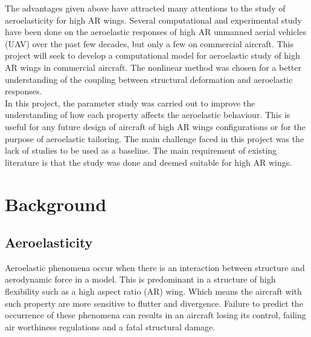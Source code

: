 \documentclass[11pt]{article}
\begin{document}
The advantages given above have attracted many attentions to the study of aeroelasticity for high AR wings. Several computational and experimental study have been done on the aeroelastic responses of high AR unmanned aerial vehicles (UAV) over the past few decades, but only a few on commercial aircraft. This project will seek to develop a computational model for aeroelastic study of high AR wings in commercial aircraft. The nonlinear method was chosen for a better understanding of the coupling between structural deformation and aeroelastic responses.\\

In this project, the parameter study was carried out to improve the understanding of how each property affects the aeroelastic behaviour. This is useful for any future design of aircraft of high AR wings configurations or for the purpose of aeroelastic tailoring. The main challenge faced in this project was the lack of studies to be used as a baseline. The main requirement of existing literature is that the study was done and deemed suitable for high AR wings.

\section{Background}
\label{sec:background}

\subsection{Aeroelasticity}
Aeroelastic phenomena occur when there is an interaction between structure and aerodynamic force in a model. This is predominant in a structure of high flexibility such as a high aspect ratio (AR) wing. Which means the aircraft with such property are more sensitive to flutter and divergence. Failure to predict the occurrence of these phenomena can results in an aircraft losing its control, failing air worthiness regulations and a fatal structural damage.\\
\end{document}
